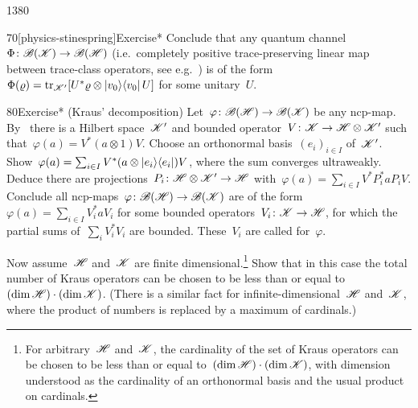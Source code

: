 \begin{parsec}{1380}
\begin{point}{70}[physics-stinespring]{Exercise*}
    Conclude that any quantum channel
        $\Phi \colon \mathscr{B}(\mathscr{K}) \to \mathscr{B}(\mathscr{H})$
        (i.e.~completely positive trace-preserving
            linear map between trace-class operators,
            see e.g.~\cite[\S2.6.2]{tomamichel})
        is of the
        form~$\Phi(\varrho) = \mathop{\mathrm{tr}}_{\mathscr{K}'}
            [U^* \varrho \otimes \left|v_0\right>\!\left<v_0\right| U]$
            for some unitary~$U$.
\end{point}
\begin{point}{80}{Exercise* (Kraus' decomposition)}%
Let~$\varphi \colon \mathscr{B}(\mathscr{H}) \to \mathscr{B}(\mathscr{K})$
    be any ncp-map.
By~
    there is a Hilbert space~$\mathscr{K}'$
    and bounded operator~$V\colon \mathscr{K} \to \mathscr{H} \otimes \mathscr{K}'$
    such that~$\varphi(a) = V^* (a \otimes 1) V$.
Choose an orthonormal basis~$(e_i)_{i \in I}$ of~$\mathscr{K}'$.
Show~$\varphi(a) = \sum_{i \in I} V^* (a \otimes \left|e_i\right>\!\left<e_i\right|) V$,
where the sum converges ultraweakly.
Deduce there are projections~$P_i \colon \mathscr{H} \otimes \mathscr{K}' \to \mathscr{H}$
with~$\varphi(a) = \sum_{i \in I} V^*P_i^* a P_iV$.
Conclude all ncp-maps~$\varphi\colon \mathscr{B}(\mathscr{H}) \to \mathscr{B}(\mathscr{K})$
are of the form~$\varphi(a) = \sum_{i \in I} V_i^* a V_i$
for some bounded operators~$V_i\colon \mathscr{K} \to \mathscr{H}$,
for which the partial sums of~$\sum_i V_i^*V_i$ are bounded.
These~$V_i$ are called  for~$\varphi$.

Now assume~$\mathscr{H}$ and~$\mathscr{K}$ are finite dimensional.\footnote{%
        For arbitrary~$\mathscr{H}$ and~$\mathscr{K}$,
            the cardinality of the set of Kraus operators
            can be chosen to be less than or equal
            to~$(\dim \mathscr{H}) \cdot (\dim \mathscr{K})$,
            with dimension understood as the cardinality of
                an orthonormal basis and the usual product on cardinals.}
Show that in this case
    the total number of Kraus operators can be chosen
    to be less than or equal to~$(\dim \mathscr{H}) \cdot (\dim \mathscr{K})$.
    (There is a similar fact for infinite-dimensional~$\mathscr{H}$ and~$\mathscr{K}$,
        where the product of numbers is replaced by a maximum of cardinals.)
\end{point}
\end{parsec}

